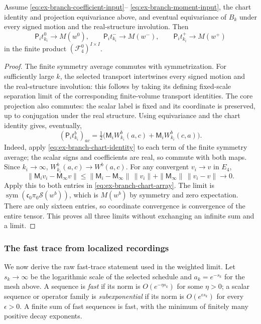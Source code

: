 \begin{proposition}
\label{prop:ex-branch-moments}
Assume \eqref{eq:ex-branch-coefficient-input}--
\eqref{eq:ex-branch-moment-input}, the chart identity and projection
equivariance above, and eventual equivariance of $B_k$ under every signed
motion and the real-structure involution. Then
\[
 \mathsf P_i t^0_{k_i}\longrightarrow M(w^0),\qquad
 \mathsf P_i t^-_{k_i}\longrightarrow M(w^-),\qquad
 \mathsf P_i t^+_{k_i}\longrightarrow M(w^+)
\]
in the finite product $(\mathcal F_4^0)^{I\times I}$.
\end{proposition}
\begin{proof}
The finite symmetry average commutes with symmetrization. For sufficiently
large $k$, the selected transport intertwines every signed motion and the
real-structure involution: this follows by taking its defining fixed-scale
separation limit of the corresponding finite-volume transport identities.
The core projection also commutes: the scalar label is fixed and its
coordinate is preserved, up to conjugation under the real structure. Using
equivariance and the chart identity gives, eventually,
\begin{equation}
 (\mathsf P_i t^b_{k_i})_{ac}=
 \tfrac12\bigl(\mathsf M_i W^b_{k_i}(a,c)
                 +\mathsf M_i W^b_{k_i}(c,a)\bigr).
 \label{eq:ex-branch-chart-array}
\end{equation}
Indeed, apply \eqref{eq:ex-branch-chart-identity} to each term of the
finite symmetry average; the scalar signs and coefficients are real, so
commute with both maps. Since $k_i\to\infty$,
$W^b_{k_i}(a,c)\to W^b(a,c)$. For any convergent $v_i\to v$ in $E_4$,
\[
 \|\mathsf M_i v_i-\mathsf M_\infty v\|
 \leq \|\mathsf M_i-\mathsf M_\infty\|\,\|v_i\|
       +\|\mathsf M_\infty\|\,\|v_i-v\|\longrightarrow0.
\]
Apply this to both entries in \eqref{eq:ex-branch-chart-array}. The limit
is $\operatorname{sym}(\mathfrak c_0\pi_0\mathcal S(w^b))$, which is
$M(w^b)$ by symmetry and zero expectation. There are only sixteen entries,
so coordinate convergence is convergence of the entire tensor. This proves
all three limits without exchanging an infinite sum and a limit.
\end{proof}

\subsubsection{The fast trace from localized recordings}
\label{subsec:ex-branch-fast-trace}

We now derive the raw fast-trace statement used in the weighted limit. Let
$s_k\to\infty$ be the logarithmic scale of the selected schedule and
$a_k=e^{-s_k}$ for the mesh above. A sequence is \emph{fast} if its norm is
$O(e^{-\eta s_k})$ for some $\eta>0$; a scalar sequence or operator family
is \emph{subexponential} if its norm is $O(e^{\epsilon s_k})$ for every
$\epsilon>0$. A finite sum of fast sequences is fast, with the minimum of
finitely many positive decay exponents.

